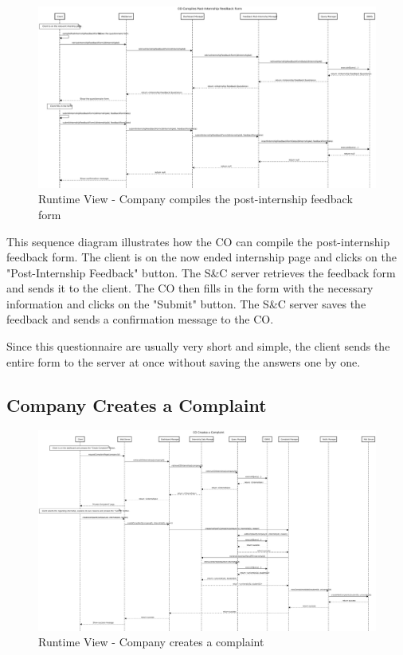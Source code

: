 \begin{figure}[H]
      \centering
      \includegraphics[width=1.0\textwidth]{Images/RV_10.pdf}
      \caption{Runtime View - Company compiles the post-internship feedback form}
      \label{fig:rv-co-compiles-feedback-form}
\end{figure}

\par This sequence diagram illustrates how the CO can compile the post-internship feedback form. The client is on the
now ended internship page and clicks on the "Post-Internship Feedback" button. The S\&C server retrieves the feedback
form and sends it to the client. The CO then fills in the form with the necessary information and clicks on the
"Submit" button. The S\&C server saves the feedback and sends a confirmation message to the CO.

\par Since this questionnaire are usually very short and simple, the client sends the entire form to the server at
once without saving the answers one by one.


\subsection{Company Creates a Complaint}
\label{sub:company-creates-a-complaint}%

\begin{figure}[H]
      \centering
      \includegraphics[width=1.0\textwidth]{Images/RV_11.pdf}
      \caption{Runtime View - Company creates a complaint}
      \label{fig:rv-co-creates-complaint}
\end{figure}

